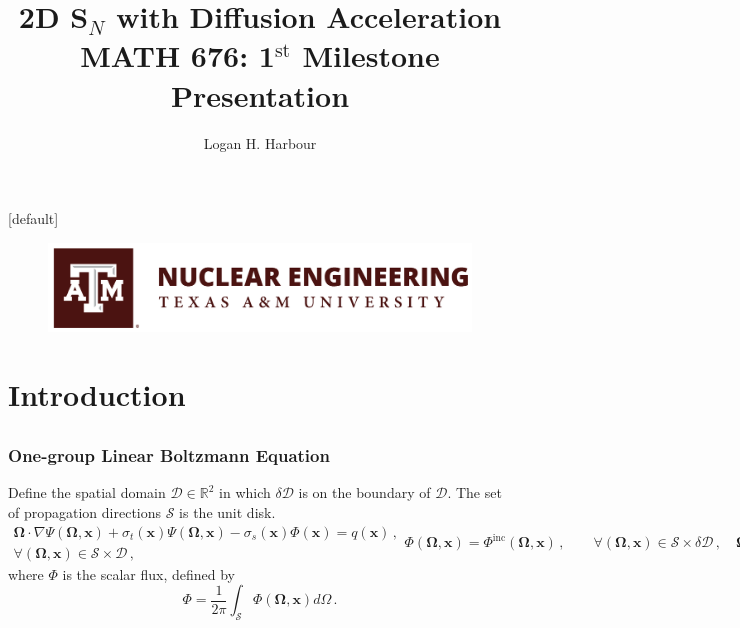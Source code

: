 \documentclass[xcolor={usenames,dvipsnames,svgnames,table}]{beamer}
\title[2D S$_N$ with Diffusion Acceleration]{2D S$_N$ with Diffusion Acceleration \\ {\small MATH 676: 1$^\text{st}$ Milestone Presentation}}
\author[L. Harbour]{Logan H. Harbour}
\institute[]{Department of Nuclear Engineering \\ Texas A\&M University}
\date[March 20, 2019]
\newcommand{\vx}{\mathbf{x}} %
\newcommand{\vo}{\pmb{\Omega}} %
\newcommand{\vn}{\mathbf{n}} %
\newcommand{\spatial}{\mathcal{D}} %
\newcommand{\bd}{\delta \mathcal{D}} %
\newcommand{\angular}{\mathcal{S}} %
\begin{document}
{
[default] 
\begin{frame}
\vfill
\titlepage
\vfill
\begin{figure}[t]
	\centering
	\includegraphics[width=.5\textwidth]{images/nuen}
\end{figure}
\vfill
\end{frame}
}

\section{Introduction}
\subsection{}

\begin{frame}\frametitle{One-group Linear Boltzmann Equation}
	Define the spatial domain $\spatial \in \mathbb{R}^2$ in which $\bd$ is on the boundary of $\spatial$. The set of propagation directions $\angular$ is the unit disk.
	\begin{subequations}
		\label{eq:boltzmann}
		\begin{multline}
			\vo \cdot \nabla \Psi(\vo, \vx) + \sigma_t(\vx) \Psi(\vo, \vx) -\sigma_s(\vx) \Phi(\vx) = q(\vx)\,, \\ \forall (\vo, \vx) \in \angular \times \spatial\,,
		\end{multline}
		\begin{equation}
		\Phi(\vo, \vx) = \Phi^\text{inc} (\vo, \vx)\,, \qquad \forall(\vo, \vx) \in \angular \times \bd\,,\quad \vo \cdot \vn(\vx) < 0\,,
		\end{equation}
	\end{subequations}
	where $\Phi$ is the scalar flux, defined by
	\[
		\Phi = \frac{1}{2\pi} \int_{\angular} \Phi(\vo, \vx) d\Omega\,.
	\]
\end{frame}
\end{document}
